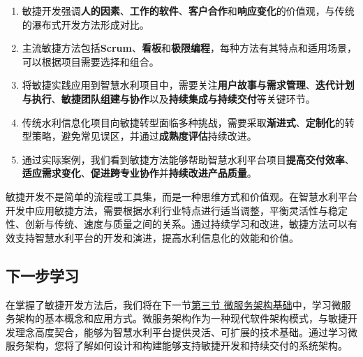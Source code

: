 \begin{enumerate}
\def\labelenumi{\arabic{enumi}.}
\item
  敏捷开发强调\textbf{人的因素}、\textbf{工作的软件}、\textbf{客户合作}和\textbf{响应变化}的价值观，与传统的瀑布式开发方法形成对比。
\item
  主流敏捷方法包括\textbf{Scrum}、\textbf{看板}和\textbf{极限编程}，每种方法有其特点和适用场景，可以根据项目需要选择和组合。
\item
  将敏捷实践应用到智慧水利项目中，需要关注\textbf{用户故事与需求管理}、\textbf{迭代计划与执行}、\textbf{敏捷团队组建与协作}以及\textbf{持续集成与持续交付}等关键环节。
\item
  传统水利信息化项目向敏捷转型面临多种挑战，需要采取\textbf{渐进式}、\textbf{定制化}的转型策略，避免常见误区，并通过\textbf{成熟度评估}持续改进。
\item
  通过实际案例，我们看到敏捷方法能够帮助智慧水利平台项目\textbf{提高交付效率}、\textbf{适应需求变化}、\textbf{促进跨专业协作}并\textbf{持续改进产品质量}。
\end{enumerate}

敏捷开发不是简单的流程或工具集，而是一种思维方式和价值观。在智慧水利平台开发中应用敏捷方法，需要根据水利行业特点进行适当调整，平衡灵活性与稳定性、创新与传统、速度与质量之间的关系。通过持续学习和改进，敏捷方法可以有效支持智慧水利平台的开发和演进，提高水利信息化的效能和价值。

\subsection{下一步学习}\label{ux4e0bux4e00ux6b65ux5b66ux4e60}

在掌握了敏捷开发方法后，我们将在下一节\href{section03-03.md}{第三节
微服务架构基础}中，学习微服务架构的基本概念和应用方式。微服务架构作为一种现代软件架构模式，与敏捷开发理念高度契合，能够为智慧水利平台提供灵活、可扩展的技术基础。通过学习微服务架构，您将了解如何设计和构建能够支持敏捷开发和持续交付的系统架构。

